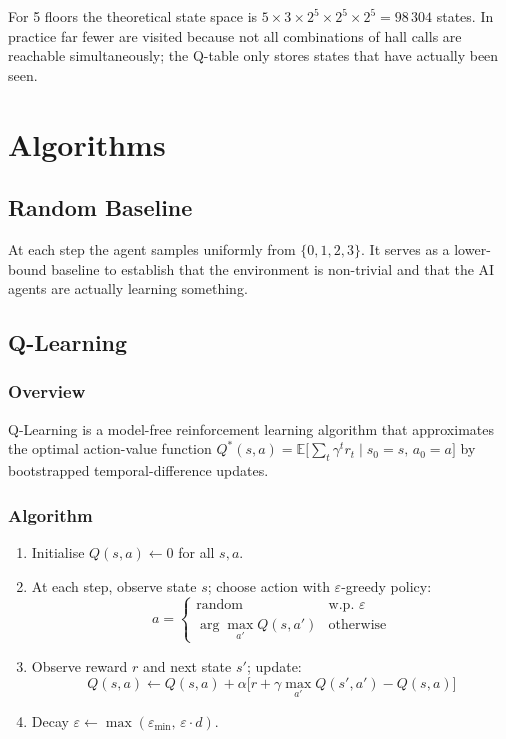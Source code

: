 \documentclass[12pt,a4paper]{article}
\begin{document}
For 5 floors the theoretical state space is
$5 \times 3 \times 2^5 \times 2^5 \times 2^5 = 98\,304$ states.
In practice far fewer are visited because not all combinations of hall calls are
reachable simultaneously; the Q-table only stores states that have actually been seen.

\section{Algorithms}

\subsection{Random Baseline}

At each step the agent samples uniformly from $\{0,1,2,3\}$.  It serves as a
lower-bound baseline to establish that the environment is non-trivial and that
the AI agents are actually learning something.

\subsection{Q-Learning}

\subsubsection{Overview}

Q-Learning \cite{watkins1992} is a model-free reinforcement learning algorithm that
approximates the optimal action-value function
$Q^*(s,a) = \mathbb{E}\bigl[\sum_{t} \gamma^t r_t \mid s_0=s,\, a_0=a\bigr]$
by bootstrapped temporal-difference updates.

\subsubsection{Algorithm}

\begin{enumerate}[leftmargin=2em]
    \item Initialise $Q(s,a) \leftarrow 0$ for all $s,a$.
    \item At each step, observe state $s$; choose action with
          $\varepsilon$-greedy policy:
          \[
          a = \begin{cases} \text{random} & \text{w.p. } \varepsilon \\
                            \arg\max_{a'} Q(s,a') & \text{otherwise}
              \end{cases}
          \]
    \item Observe reward $r$ and next state $s'$; update:
          \[
          Q(s,a) \leftarrow Q(s,a) + \alpha\bigl[r + \gamma \max_{a'} Q(s',a') - Q(s,a)\bigr]
          \]
    \item Decay $\varepsilon \leftarrow \max(\varepsilon_{\min},\, \varepsilon \cdot d)$.
\end{enumerate}
\end{document}

